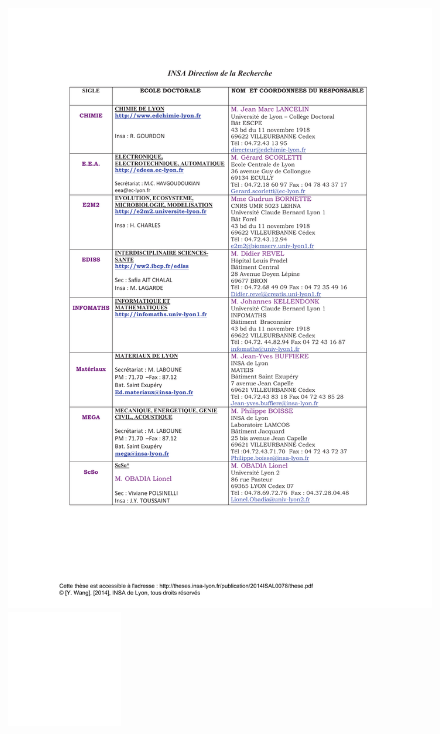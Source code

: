 \begin{figure}[htbp]
    \hspace*{-2cm}
    \includegraphics[trim=0cm 3cm 0cm 0cm, width=1.30\textwidth]{gfx/ED.pdf} %
    \includegraphics[height=3cm, width=\textwidth]{images/misc/WhitePixel} %
\end{figure}

